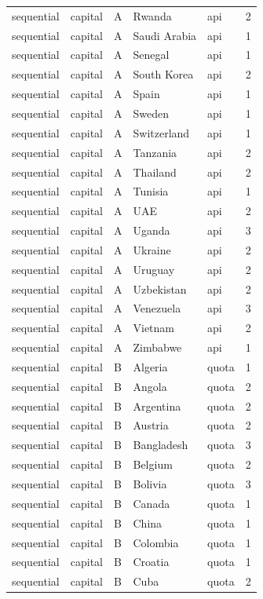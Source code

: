\begin{tabular}{lllllr}
sequential & capital & A & Rwanda & api & 2 \\
sequential & capital & A & Saudi Arabia & api & 1 \\
sequential & capital & A & Senegal & api & 1 \\
sequential & capital & A & South Korea & api & 2 \\
sequential & capital & A & Spain & api & 1 \\
sequential & capital & A & Sweden & api & 1 \\
sequential & capital & A & Switzerland & api & 1 \\
sequential & capital & A & Tanzania & api & 2 \\
sequential & capital & A & Thailand & api & 2 \\
sequential & capital & A & Tunisia & api & 1 \\
sequential & capital & A & UAE & api & 2 \\
sequential & capital & A & Uganda & api & 3 \\
sequential & capital & A & Ukraine & api & 2 \\
sequential & capital & A & Uruguay & api & 2 \\
sequential & capital & A & Uzbekistan & api & 2 \\
sequential & capital & A & Venezuela & api & 3 \\
sequential & capital & A & Vietnam & api & 2 \\
sequential & capital & A & Zimbabwe & api & 1 \\
sequential & capital & B & Algeria & quota & 1 \\
sequential & capital & B & Angola & quota & 2 \\
sequential & capital & B & Argentina & quota & 2 \\
sequential & capital & B & Austria & quota & 2 \\
sequential & capital & B & Bangladesh & quota & 3 \\
sequential & capital & B & Belgium & quota & 2 \\
sequential & capital & B & Bolivia & quota & 3 \\
sequential & capital & B & Canada & quota & 1 \\
sequential & capital & B & China & quota & 1 \\
sequential & capital & B & Colombia & quota & 1 \\
sequential & capital & B & Croatia & quota & 1 \\
sequential & capital & B & Cuba & quota & 2 \\

\end{tabular}
